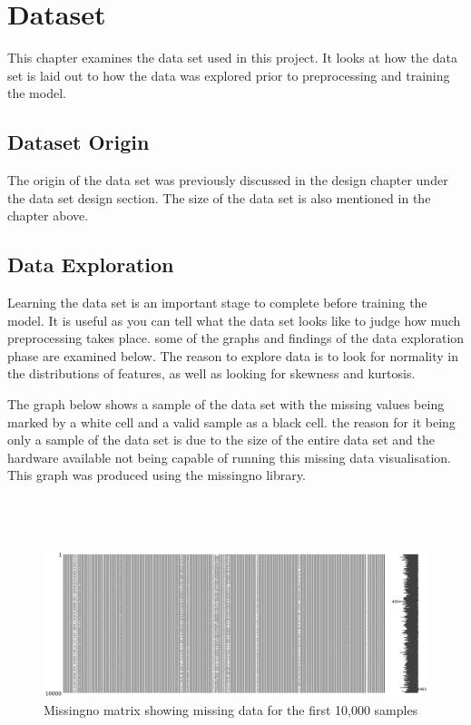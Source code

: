\chapter{Dataset}\label{ch:Data}

This chapter examines the data set used in this project. It looks at how the data set is laid out to how the data was explored prior to preprocessing and training the model. 

\section{Dataset Origin}
The origin of the data set was previously discussed in the design chapter under the data set design section. The size of the data set is also mentioned in the chapter above.

\section{Data Exploration}
Learning the data set is an important stage to complete before training the model. It is useful as you can tell what the data set looks like to judge how much preprocessing takes place. some of the graphs and findings of the data exploration phase are examined below. The reason to explore data is to look for normality in the distributions of features, as well as looking for skewness and kurtosis.


The graph below shows a sample of the data set with the missing values being marked by a white cell and a valid sample as a black cell. the reason for it being only a sample of the data set is due to the size of the entire data set and the hardware available not being capable of running this missing data visualisation. This graph was produced using the missingno library.\\\\\\\\

\begin{figure}[h!]
  \centering
  \includegraphics[width = (\textwidth)/2]{missingVals.png}
  \caption{Missingno matrix showing missing data for the first 10,000 samples}
  \label{fig:MV}
\end{figure}

